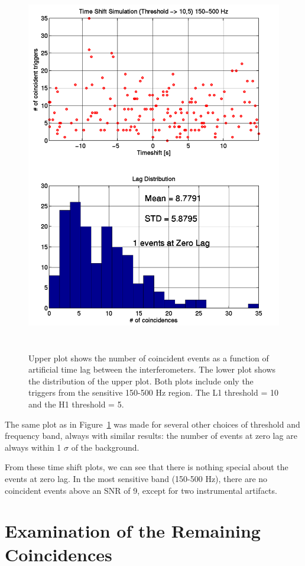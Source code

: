 \begin{figure}[!h]
\centerline{\includegraphics[angle=0,height=6.5in]{Figures/Chap7/lag_mid_dist.png}}
\caption[Time Lags]{Upper plot shows the number of coincident events as a
         function of artificial time lag between the interferometers. The
         lower plot shows the distribution of the upper plot. Both plots
         include only the triggers from the sensitive 150-500 Hz region. The
         L1 threshold = 10 and the H1 threshold = 5.}
\label{fig:timelag}
\end{figure}
The same plot as in Figure~\ref{fig:timelag} was made for several other choices
of threshold and frequency band, always with similar results: the number of
events at zero lag are always within 1 $\sigma$ of the background.

From these time shift plots, we can see that there is nothing special about the 
events at zero lag. In the most sensitive band (150-500 Hz), there are no
coincident events above an SNR of 9, except for two instrumental artifacts.


\section{Examination of the Remaining Coincidences}

